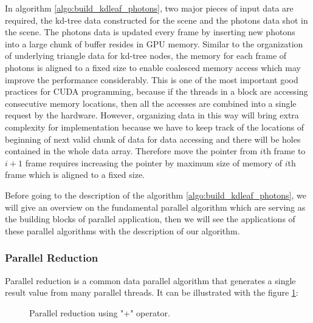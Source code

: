 \vspace{30pt}

In algorithm \ref{algo:build_kdleaf_photons}, two major pieces of input data are required, the kd-tree data constructed for the scene and the photons data shot in the scene. The photons data is updated every frame by inserting new photons into a large chunk of buffer resides in GPU memory. Similar to the organization of underlying triangle data for kd-tree nodes, the memory for each frame of photons is aligned to a fixed size to enable coalesced memory access which may improve the performance considerably. This is one of the most important good practices for CUDA programming, because if the threads in a block are accessing consecutive memory locations, then all the accesses are combined into a single request by the hardware. However, organizing data in this way will bring extra complexity for implementation because we have to keep track of the locations of beginning of next valid chunk of data for data accessing and there will be holes contained in the whole data array. Therefore move the pointer from \(i\)th frame to \(i+1\) frame requires increasing the pointer by maximum size of memory of \(i\)th frame which is aligned to a fixed size.

Before going to the description of the algorithm \ref{algo:build_kdleaf_photons}, we will give an overview on the fundamental parallel algorithm which are serving as the building blocks of parallel application, then we will see the applications of these parallel algorithms with the description of our algorithm. 
\subsubsection{Parallel Reduction} 
Parallel reduction is a common data parallel algorithm that generates a single result value from many parallel threads. It can be illustrated with the figure \ref{fig:parallel_reduction}: 

\begin{figure}
    \centering
    \renewcommand{\thefigure}{\thechapter.\arabic{figure}}
    \caption[Parallel Reduction]{Parallel reduction using "+" operator. }
    \label{fig:parallel_reduction}
\end{figure} 

